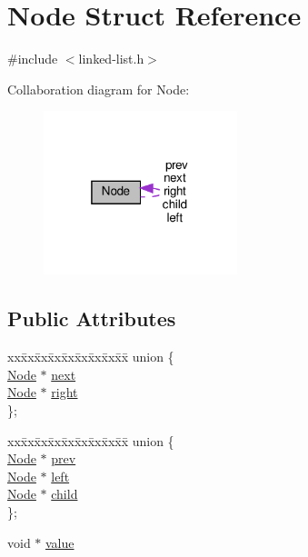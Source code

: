 \hypertarget{structNode}{}\section{Node Struct Reference}
\label{structNode}


{\ttfamily \#include $<$linked-\/list.\+h$>$}



Collaboration diagram for Node\+:\nopagebreak
\begin{figure}[H]
\begin{center}
\leavevmode
\includegraphics[width=160pt]{structNode__coll__graph}
\end{center}
\end{figure}
\subsection*{Public Attributes}
\begin{DoxyCompactItemize}
\item 
\begin{tabbing}
xx\=xx\=xx\=xx\=xx\=xx\=xx\=xx\=xx\=\kill
union \{\\
\>\hyperlink{structNode}{Node} $\ast$ \hyperlink{structNode_a2559a716f69ccaa76d648d9f1b83065e}{next}\\
\>\hyperlink{structNode}{Node} $\ast$ \hyperlink{structNode_a7328862eaa6dea28018326549b3294d3}{right}\\
\}; \\

\end{tabbing}\item 
\begin{tabbing}
xx\=xx\=xx\=xx\=xx\=xx\=xx\=xx\=xx\=\kill
union \{\\
\>\hyperlink{structNode}{Node} $\ast$ \hyperlink{structNode_a632ea91c6a13082308f7692649a68880}{prev}\\
\>\hyperlink{structNode}{Node} $\ast$ \hyperlink{structNode_ab8c667ac8fdb120ed4c031682a9cdaee}{left}\\
\>\hyperlink{structNode}{Node} $\ast$ \hyperlink{structNode_ad55e191b2855879d7b761258d64e2667}{child}\\
\}; \\

\end{tabbing}\item 
void $\ast$ \hyperlink{structNode_a520bf86af21ca233eb9f58e9e28c6576}{value}
\end{DoxyCompactItemize}


